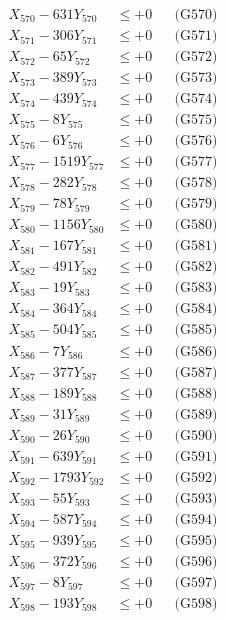 \documentclass[a4paper,10pt]{article}
\begin{document}
{\begin{align}
X_{570} - 631Y_{570} &\leq +0 && \text{(G570)} \\
\allowbreak
X_{571} - 306Y_{571} &\leq +0 && \text{(G571)} \\
X_{572} - 65Y_{572} &\leq +0 && \text{(G572)} \\
X_{573} - 389Y_{573} &\leq +0 && \text{(G573)} \\
X_{574} - 439Y_{574} &\leq +0 && \text{(G574)} \\
X_{575} - 8Y_{575} &\leq +0 && \text{(G575)} \\
X_{576} - 6Y_{576} &\leq +0 && \text{(G576)} \\
X_{577} - 1519Y_{577} &\leq +0 && \text{(G577)} \\
X_{578} - 282Y_{578} &\leq +0 && \text{(G578)} \\
X_{579} - 78Y_{579} &\leq +0 && \text{(G579)} \\
X_{580} - 1156Y_{580} &\leq +0 && \text{(G580)} \\
\allowbreak
X_{581} - 167Y_{581} &\leq +0 && \text{(G581)} \\
X_{582} - 491Y_{582} &\leq +0 && \text{(G582)} \\
X_{583} - 19Y_{583} &\leq +0 && \text{(G583)} \\
X_{584} - 364Y_{584} &\leq +0 && \text{(G584)} \\
X_{585} - 504Y_{585} &\leq +0 && \text{(G585)} \\
X_{586} - 7Y_{586} &\leq +0 && \text{(G586)} \\
X_{587} - 377Y_{587} &\leq +0 && \text{(G587)} \\
X_{588} - 189Y_{588} &\leq +0 && \text{(G588)} \\
X_{589} - 31Y_{589} &\leq +0 && \text{(G589)} \\
X_{590} - 26Y_{590} &\leq +0 && \text{(G590)} \\
\allowbreak
X_{591} - 639Y_{591} &\leq +0 && \text{(G591)} \\
X_{592} - 1793Y_{592} &\leq +0 && \text{(G592)} \\
X_{593} - 55Y_{593} &\leq +0 && \text{(G593)} \\
X_{594} - 587Y_{594} &\leq +0 && \text{(G594)} \\
X_{595} - 939Y_{595} &\leq +0 && \text{(G595)} \\
X_{596} - 372Y_{596} &\leq +0 && \text{(G596)} \\
X_{597} - 8Y_{597} &\leq +0 && \text{(G597)} \\
X_{598} - 193Y_{598} &\leq +0 && \text{(G598)} \\

\end{align}}
\end{document}
